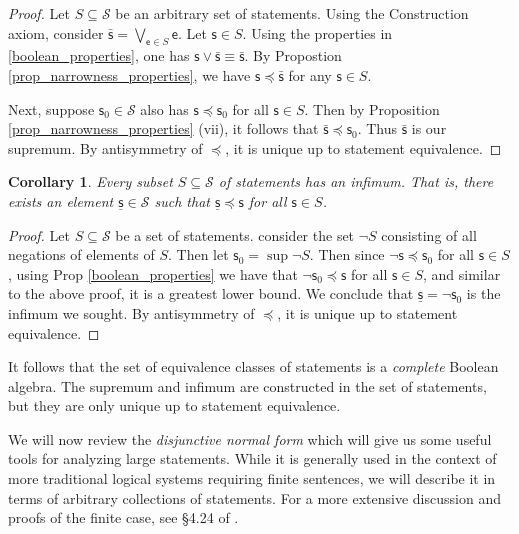 \documentclass[psamsfonts]{amsart}
\newtheorem{cor}[thm]{Corollary}
\theoremstyle{definition}
\theoremstyle{remark}
\numberwithin{equation}{section}
\def\stmtSet{\mathcal{S}}
\def\narrower{\preccurlyeq}
\def\OR{\vee}
\def\bigOR{\bigvee}
\def\NOT{\neg}
\newcommand{\stmt}[1][s] {\mathsf{#1}}
\begin{document}
\begin{proof}
	Let $S \subseteq \stmtSet$ be an arbitrary set of statements. Using the Construction axiom, consider $\bar{\stmt}=\bigOR\limits_{\stmt[e] \in S} \stmt[e]$. Let $\stmt \in S$. Using the properties in \ref{boolean_properties}, one has $\stmt \OR \bar{\stmt} \equiv \bar{\stmt}$. By Propostion \ref{prop_narrowness_properties}, we have $\stmt \narrower \bar{\stmt}$ for any $\stmt \in S$. 

Next, suppose $\stmt_0\in\mathcal{S}$ also has $\stmt\narrower\stmt_0$ for all $\stmt\in S$. Then by Proposition \ref{prop_narrowness_properties} (vii), it follows that $\bar{\stmt}\narrower\stmt_0$. Thus $\bar{\stmt}$ is our supremum. By antisymmetry of $\narrower$, it is unique up to statement equivalence. 
\end{proof}

\begin{cor}
	Every subset $S \subseteq \stmtSet$ of statements has an infimum. That is, there exists an element $\underline{\stmt} \in \stmtSet$ such that $\underline{\stmt} \narrower \stmt$ for all $\stmt \in S$. 
\end{cor}
\begin{proof}
Let $S\subseteq\mathcal{S}$ be a set of statements. consider the set $\NOT S$ consisting of all negations of elements of $S$. Then let $\stmt_0 = \sup\NOT S$. Then since $\NOT\stmt \narrower \stmt_0$ for all $\stmt\in S$, using Prop \ref{boolean_properties} we have that $\NOT\stmt_0\narrower\stmt$ for all $\stmt\in S$, and similar to the above proof, it is a greatest lower bound. We conclude that $\underline{\stmt} =\NOT\stmt_0$ is the infimum we sought. By antisymmetry of $\narrower$, it is unique up to statement equivalence. 
\end{proof} 

It follows that the set of equivalence classes of statements is a \emph{complete} Boolean algebra. The supremum and infimum are constructed in the set of statements, but they are only unique up to statement equivalence. 

We will now review the \emph{disjunctive normal form} which will give us some useful tools for analyzing large statements. While it is generally used in the context of more traditional logical systems requiring finite sentences, we will describe it in terms of arbitrary collections of statements. For a more extensive discussion and proofs of the finite case, see \S4.24 of \cite{lattices}. 
\end{document}
